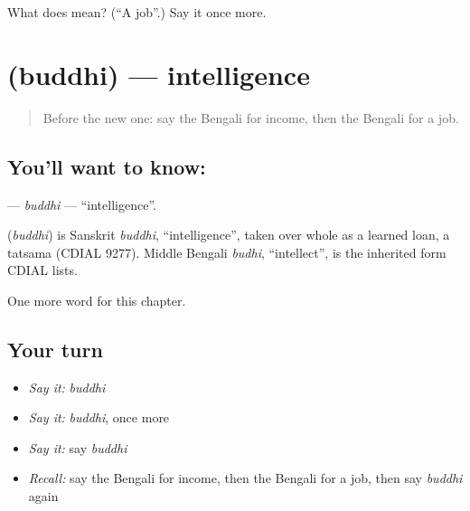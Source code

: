 \begin{tcolorbox}[breakable,colback=teal!4,colframe=teal!35!black,title={Before you move on}]
What does  mean? (\textquotedblleft{}A job\textquotedblright{}.) Say it once more.
\end{tcolorbox}
\section[\texorpdfstring{\bn{বুদ্ধি} (buddhi)}{বুদ্ধি (buddhi)}]{ (buddhi) — intelligence}

\label{lesson:BN-C99-buddhi}



\begin{quote}
Before the new one: say the Bengali for income, then the Bengali for a job.
\end{quote}

\subsection*{You'll want to know: }
\textbf{} — \emph{buddhi} — \textquotedblleft{}intelligence\textquotedblright{}.

\begin{cousinweb}
\textbf{} (\emph{buddhi}) is Sanskrit \emph{buddhi}, \textquotedblleft{}intelligence\textquotedblright{}, taken over whole as a learned loan, a tatsama (CDIAL 9277). Middle Bengali \emph{budhi}, \textquotedblleft{}intellect\textquotedblright{}, is the inherited form CDIAL lists.
\end{cousinweb}

\begin{grammarlens}[title={What you've built}]
One more word for this chapter.
\end{grammarlens}

\subsection*{Your turn}
\begin{itemize}
\raggedright
  \item \emph{Say it:} \emph{buddhi}
  \item \emph{Say it:} \emph{buddhi}, once more
  \item \emph{Say it:} say \emph{buddhi}
  \item \emph{Recall:} say the Bengali for income, then the Bengali for a job, then say \emph{buddhi} again
\end{itemize}

